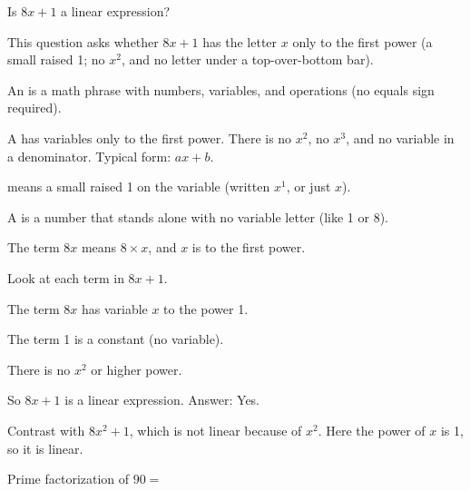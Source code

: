 


Is $8x + 1$ a linear expression?\ \blank[2.4cm]


This question asks whether $8x + 1$ has the letter $x$ only to the first power (a small raised 1; no $x^{2}$, and no letter under a top-over-bottom bar).

\begin{words}
  \item An is a math phrase with numbers, variables, and operations (no equals sign required).
  \item A has variables only to the first power. There is no $x^{2}$, no $x^{3}$, and no variable in a denominator. Typical form: $ax + b$.
  \item {}means a small raised 1 on the variable (written $x^{1}$, or just $x$).
  \item A is a number that stands alone with no variable letter (like 1 or 8).
  \item The term $8x$ means $8 \times x$, and $x$ is to the first power.
\end{words}

\begin{steps}
  \item Look at each term in $8x + 1$.
  \item The term $8x$ has variable $x$ to the power 1.
  \item The term 1 is a constant (no variable).
  \item There is no $x^{2}$ or higher power.
  \item So $8x + 1$ is a linear expression. Answer: Yes.
\end{steps}


Contrast with $8x^{2} + 1$, which is not linear because of $x^{2}$. Here the power of $x$ is 1, so it is linear.


Prime factorization of $90 = $\ansblank

